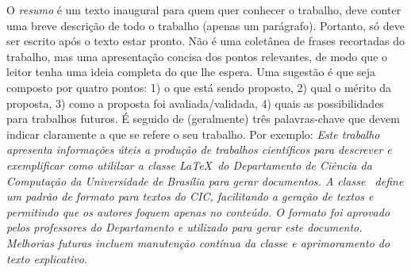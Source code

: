 O \emph{resumo} é um texto inaugural para quem quer conhecer o trabalho, deve conter
uma breve descrição de todo o trabalho (apenas um parágrafo). Portanto, só deve
ser escrito após o texto estar pronto. Não é uma coletânea de frases recortadas
do trabalho, mas uma apresentação concisa dos pontos relevantes, de modo que o
leitor tenha uma ideia completa do que lhe espera. Uma sugestão é que seja composto
por quatro pontos: 1) o que está sendo proposto, 2) qual o mérito da proposta, 3)
como a proposta foi avaliada/validada, 4) quais as possibilidades para trabalhos
futuros. É seguido de (geralmente) três palavras-chave que devem indicar claramente a que se
refere o seu trabalho. Por exemplo: \emph{Este trabalho apresenta informações úteis a produção de trabalhos
científicos para descrever e exemplificar como utililzar a classe \LaTeX\ do
Departamento de Ciência da Computação da Universidade de Brasília para gerar
documentos. A classe \unbcic\ define um padrão de formato para textos do CIC, facilitando a
geração de textos e permitindo que os autores foquem apenas no conteúdo. O formato
foi aprovado pelos professores do Departamento e utilizado para gerar este documento.
Melhorias futuras incluem manutenção contínua da classe e aprimoramento do texto
explicativo.}